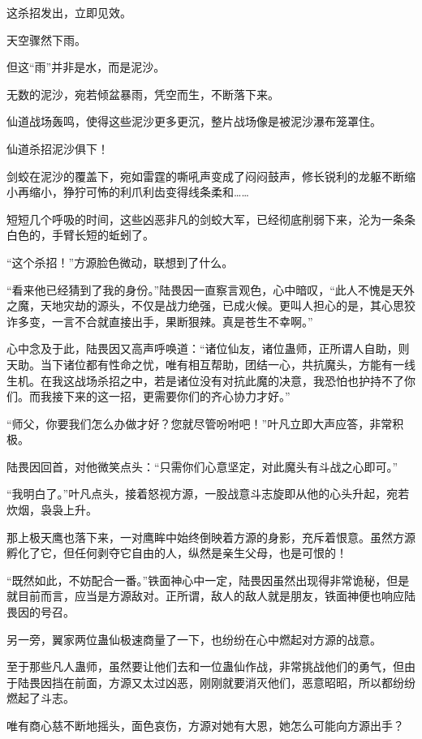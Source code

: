 \begin{this_body}
这杀招发出，立即见效。

天空骤然下雨。

但这“雨”并非是水，而是泥沙。

无数的泥沙，宛若倾盆暴雨，凭空而生，不断落下来。

仙道战场轰鸣，使得这些泥沙更多更沉，整片战场像是被泥沙瀑布笼罩住。

仙道杀招泥沙俱下！

剑蛟在泥沙的覆盖下，宛如雷霆的嘶吼声变成了闷闷鼓声，修长锐利的龙躯不断缩小再缩小，狰狞可怖的利爪利齿变得线条柔和……

短短几个呼吸的时间，这些凶恶非凡的剑蛟大军，已经彻底削弱下来，沦为一条条白色的，手臂长短的蚯蚓了。

“这个杀招！”方源脸色微动，联想到了什么。

“看来他已经猜到了我的身份。”陆畏因一直察言观色，心中暗叹，“此人不愧是天外之魔，天地灾劫的源头，不仅是战力绝强，已成火候。更叫人担心的是，其心思狡诈多变，一言不合就直接出手，果断狠辣。真是苍生不幸啊。”

心中念及于此，陆畏因又高声呼唤道：“诸位仙友，诸位蛊师，正所谓人自助，则天助。当下诸位都有性命之忧，唯有相互帮助，团结一心，共抗魔头，方能有一线生机。在我这战场杀招之中，若是诸位没有对抗此魔的决意，我恐怕也护持不了你们。而我接下来的这一招，更需要你们的齐心协力才好。”

“师父，你要我们怎么办做才好？您就尽管吩咐吧！”叶凡立即大声应答，非常积极。

陆畏因回首，对他微笑点头：“只需你们心意坚定，对此魔头有斗战之心即可。”

“我明白了。”叶凡点头，接着怒视方源，一股战意斗志旋即从他的心头升起，宛若炊烟，袅袅上升。

那上极天鹰也落下来，一对鹰眸中始终倒映着方源的身影，充斥着恨意。虽然方源孵化了它，但任何剥夺它自由的人，纵然是亲生父母，也是可恨的！

“既然如此，不妨配合一番。”铁面神心中一定，陆畏因虽然出现得非常诡秘，但是就目前而言，应当是方源敌对。正所谓，敌人的敌人就是朋友，铁面神便也响应陆畏因的号召。

另一旁，翼家两位蛊仙极速商量了一下，也纷纷在心中燃起对方源的战意。

至于那些凡人蛊师，虽然要让他们去和一位蛊仙作战，非常挑战他们的勇气，但由于陆畏因挡在前面，方源又太过凶恶，刚刚就要消灭他们，恶意昭昭，所以都纷纷燃起了斗志。

唯有商心慈不断地摇头，面色哀伤，方源对她有大恩，她怎么可能向方源出手？


\end{this_body}
